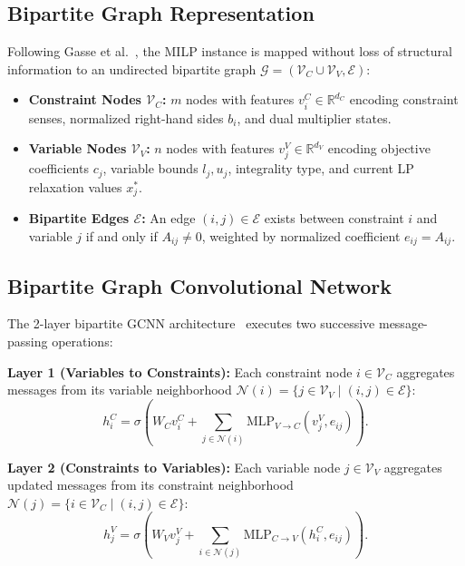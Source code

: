 \documentclass[10pt,twocolumn,letterpaper]{article}
\theoremstyle{plain}
\theoremstyle{definition}
\theoremstyle{remark}
\begin{document}
\subsection{Bipartite Graph Representation}
Following Gasse et al.~\cite{gasse2019exact}, the MILP instance is mapped without loss of structural information to an undirected bipartite graph $\mathcal{G} = (\mathcal{V}_C \cup \mathcal{V}_V, \mathcal{E})$:
\begin{itemize}
    \item \textbf{Constraint Nodes $\mathcal{V}_C$:} $m$ nodes with features $v_i^C \in \mathbb{R}^{d_C}$ encoding constraint senses, normalized right-hand sides $b_i$, and dual multiplier states.
    \item \textbf{Variable Nodes $\mathcal{V}_V$:} $n$ nodes with features $v_j^V \in \mathbb{R}^{d_V}$ encoding objective coefficients $c_j$, variable bounds $l_j, u_j$, integrality type, and current LP relaxation values $x_j^*$.
    \item \textbf{Bipartite Edges $\mathcal{E}$:} An edge $(i, j) \in \mathcal{E}$ exists between constraint $i$ and variable $j$ if and only if $A_{ij} \ne 0$, weighted by normalized coefficient $e_{ij} = A_{ij}$.
\end{itemize}

\subsection{Bipartite Graph Convolutional Network}
The 2-layer bipartite GCNN architecture~\cite{gasse2019exact,prouvost2020ecole} executes two successive message-passing operations:

\textbf{Layer 1 (Variables to Constraints):} Each constraint node $i \in \mathcal{V}_C$ aggregates messages from its variable neighborhood $\mathcal{N}(i) = \{j \in \mathcal{V}_V \mid (i, j) \in \mathcal{E}\}$:
\begin{equation}
    h_i^C = \sigma \left( W_C v_i^C + \sum_{j \in \mathcal{N}(i)} \text{MLP}_{V \to C}(v_j^V, e_{ij}) \right). \label{eq:gcnn_layer1}
\end{equation}

\textbf{Layer 2 (Constraints to Variables):} Each variable node $j \in \mathcal{V}_V$ aggregates updated messages from its constraint neighborhood $\mathcal{N}(j) = \{i \in \mathcal{V}_C \mid (i, j) \in \mathcal{E}\}$:
\begin{equation}
    h_j^V = \sigma \left( W_V v_j^V + \sum_{i \in \mathcal{N}(j)} \text{MLP}_{C \to V}(h_i^C, e_{ij}) \right). \label{eq:gcnn_layer2}
\end{equation}
\end{document}
